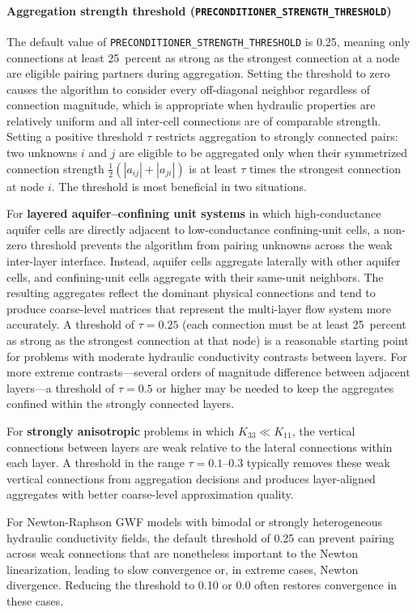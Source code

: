 \paragraph{Aggregation strength threshold (\texttt{PRECONDITIONER\_STRENGTH\_THRESHOLD})}
The default value of \texttt{PRECONDITIONER\_STRENGTH\_THRESHOLD} is 0.25, meaning only connections at least 25~percent as strong as the strongest connection at a node are eligible pairing partners during aggregation. Setting the threshold to zero causes the algorithm to consider every off-diagonal neighbor regardless of connection magnitude, which is appropriate when hydraulic properties are relatively uniform and all inter-cell connections are of comparable strength. Setting a positive threshold $\tau$ restricts aggregation to strongly connected pairs: two unknowns $i$ and $j$ are eligible to be aggregated only when their symmetrized connection strength $\frac{1}{2}(|a_{ij}| + |a_{ji}|)$ is at least $\tau$ times the strongest connection at node $i$. The threshold is most beneficial in two situations.

For \textbf{layered aquifer--confining unit systems} in which high-conductance aquifer cells are directly adjacent to low-conductance confining-unit cells, a non-zero threshold prevents the algorithm from pairing unknowns across the weak inter-layer interface. Instead, aquifer cells aggregate laterally with other aquifer cells, and confining-unit cells aggregate with their same-unit neighbors. The resulting aggregates reflect the dominant physical connections and tend to produce coarse-level matrices that represent the multi-layer flow system more accurately. A threshold of $\tau = 0.25$ (each connection must be at least 25~percent as strong as the strongest connection at that node) is a reasonable starting point for problems with moderate hydraulic conductivity contrasts between layers. For more extreme contrasts---several orders of magnitude difference between adjacent layers---a threshold of $\tau = 0.5$ or higher may be needed to keep the aggregates confined within the strongly connected layers.

For \textbf{strongly anisotropic} problems in which $K_{33} \ll K_{11}$, the vertical connections between layers are weak relative to the lateral connections within each layer. A threshold in the range $\tau = 0.1$--$0.3$ typically removes these weak vertical connections from aggregation decisions and produces layer-aligned aggregates with better coarse-level approximation quality.

For Newton-Raphson GWF models with bimodal or strongly heterogeneous hydraulic conductivity fields, the default threshold of 0.25 can prevent pairing across weak connections that are nonetheless important to the Newton linearization, leading to slow convergence or, in extreme cases, Newton divergence. Reducing the threshold to 0.10 or 0.0 often restores convergence in these cases.

